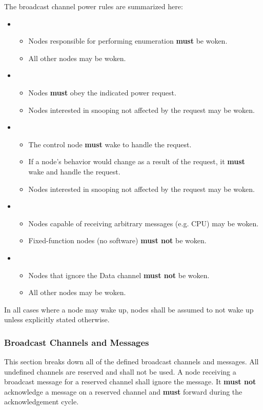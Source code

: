 \medskip\noindent
The \bus broadcast channel power rules are summarized here:
\begin{itemize}
  \item {}
  \begin{itemize}
    \item Nodes responsible for performing enumeration {\bf must} be woken.
    \item All other nodes may be woken.
  \end{itemize}
  \item {}
  \begin{itemize}
    \item Nodes {\bf must} obey the indicated power request.
    \item Nodes interested in snooping not affected by the request may be woken.
  \end{itemize}
  \item {}
  \begin{itemize}
    \item The control node {\bf must} wake to handle the request.
    \item If a node's behavior would change as a result of the request, it
          {\bf must} wake and handle the request.
    \item Nodes interested in snooping not affected by the request may be woken.
  \end{itemize}
  \item {}
  \begin{itemize}
    \item Nodes capable of receiving arbitrary messages (e.g. CPU) may be
             woken.
    \item Fixed-function nodes (no software) {\bf must not} be woken.
  \end{itemize}
  \item {}
  \begin{itemize}
    \item Nodes that ignore the Data channel {\bf must not} be woken.
    \item All other nodes may be woken.
  \end{itemize}
\end{itemize}
%
In all cases where a node may wake up, nodes shall be assumed to not wake up
unless explicitly stated otherwise.

\subsubsection{Broadcast Channels and Messages}
This section breaks down all of the defined \bus broadcast channels and messages.
All undefined channels are reserved and shall not be used. A node receiving a
broadcast message for a reserved channel shall ignore the message. It {\bf
must not} acknowledge a message on a reserved channel and {\bf must} forward
during the acknowledgement cycle.

